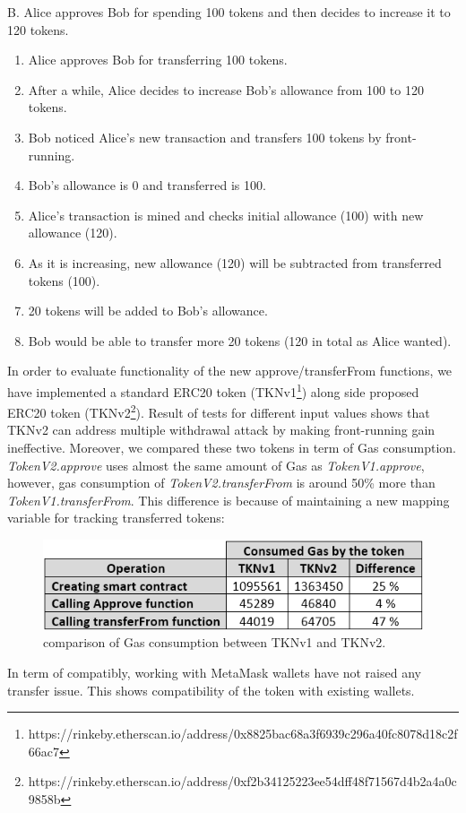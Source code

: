 \noindent B. Alice approves Bob for spending 100 tokens and then decides to increase it to 120 tokens.
\begin{enumerate}
	\item Alice approves Bob for transferring 100 tokens.
	\item After a while, Alice decides to increase Bob’s allowance from 100 to 120 tokens.
	\item Bob noticed Alice’s new transaction and transfers 100 tokens by front-running.
	\item Bob’s allowance is 0 and transferred is 100.
	\item Alice’s transaction is mined and checks initial allowance (100) with new allowance (120).
	\item As it is increasing, new allowance (120) will be subtracted from transferred tokens (100).
	\item 20 tokens will be added to Bob’s allowance.
	\item Bob would be able to transfer more 20 tokens (120 in total as Alice wanted).
\end{enumerate}
In order to evaluate functionality of the new approve/transferFrom functions, we have implemented a standard ERC20 token (TKNv1\footnote{https://rinkeby.etherscan.io/address/0x8825bac68a3f6939c296a40fc8078d18c2f66ac7}) along side proposed ERC20 token (TKNv2\footnote{https://rinkeby.etherscan.io/address/0xf2b34125223ee54dff48f71567d4b2a4a0c9858b}). Result of tests for different input values shows that TKNv2 can address multiple withdrawal attack by making front-running gain ineffective. Moreover, we compared these two tokens in term of Gas consumption. \textit{TokenV2.approve} uses almost the same amount of Gas as \textit{TokenV1.approve}, however, gas consumption of \textit{TokenV2.transferFrom} is around 50\% more than \textit{TokenV1.transferFrom}. This difference is because of maintaining a new mapping variable for tracking transferred tokens:
\begin{figure}[H]
	\centering
	\includegraphics[width=1.0\linewidth]{figures/multiple_withdrawal_22.png}
	\caption{comparison of Gas consumption between TKNv1 and TKNv2.}
\end{figure}
\noindent In term of compatibly, working with MetaMask wallets have not raised any transfer issue. This shows compatibility of the token with existing wallets.

